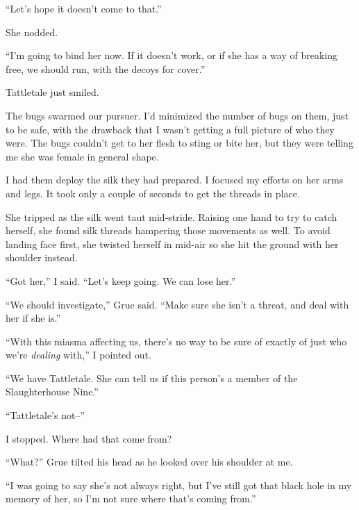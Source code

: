 ``Let's hope it doesn't come to that.''



She nodded.



``I'm going to bind her now.  If it doesn't work, or if she has a way of breaking free, we should run, with the decoys for cover.''



Tattletale just smiled.



The bugs swarmed our pursuer.  I'd minimized the number of bugs on them, just to be safe, with the drawback that I wasn't getting a full picture of who they were.  The bugs couldn't get to her flesh to sting or bite her, but they were telling me she was female in general shape.



I had them deploy the silk they had prepared.  I focused my efforts on her arms and legs.  It took only a couple of seconds to get the threads in place.



She tripped as the silk went taut mid-stride.  Raising one hand to try to catch herself, she found silk threads hampering those movements as well.  To avoid landing face first, she twisted herself in mid-air so she hit the ground with her shoulder instead.



``Got her,'' I said.  ``Let's keep going.  We can lose her.''



``We should investigate,'' Grue said.  ``Make sure she isn't a threat, and deal with her if she is.''



``With this miasma affecting us, there's no way to be sure of exactly of just who we're \emph{dealing} with,'' I pointed out.



``We have Tattletale.  She can tell us if this person's a member of the Slaughterhouse Nine.''



``Tattletale's not--''



I stopped.  Where had that come from?



``What?''  Grue tilted his head as he looked over his shoulder at me.



``I was going to say she's not always right, but I've still got that black hole in my memory of her, so I'm not sure where that's coming from.''



